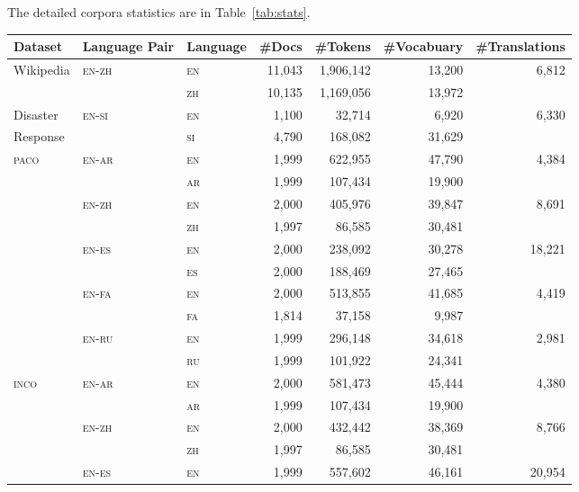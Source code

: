 \documentclass[paper=a4, fontsize=11pt]{article}
\newcommand{\paco}{\textsc{paco}\xspace}
\newcommand{\inco}{\textsc{inco}\xspace}
\newcommand{\en}{\textsc{en}\xspace}
\newcommand{\ar}{\textsc{ar}\xspace}
\newcommand{\zh}{\textsc{zh}\xspace}
\newcommand{\es}{\textsc{es}\xspace}
\newcommand{\fa}{\textsc{fa}\xspace}
\newcommand{\ru}{\textsc{ru}\xspace}
\newcommand{\si}{\textsc{si}\xspace}
\begin{document}
The detailed corpora statistics are in Table~\ref{tab:stats}.

\begin{table}[h]
  \centering
  \begin{tabular}{lllrrrr}
    Dataset & Language Pair & Language & \#Docs & \#Tokens & \#Vocabuary & \#Translations\\ \hline \hline
    \multirow{2}{*}{Wikipedia} & \multirow{2}{*}{\en-\zh} & \en & 11,043 & 1,906,142 & 13,200 & \multirow{2}{*}{6,812} \\
     & & \zh & 10,135 & 1,169,056 & 13,972 & \\ \hline
    Disaster & \multirow{2}{*}{\en-\si} & \en & 1,100 & 32,714 & 6,920 & \multirow{2}{*}{6,330} \\
    Response & & \si & 4,790 & 168,082 & 31,629 & \\ \hline
    \multirow{10}{*}{\paco} & \multirow{2}{*}{\en-\ar} & \en & 1,999 & 622,955 & 47,790 & \multirow{2}{*}{4,384} \\
     & & \ar & 1,999 & 107,434 & 19,900 & \\ \cline{2-7}
     & \multirow{2}{*}{\en-\zh} & \en & 2,000 & 405,976 & 39,847 & \multirow{2}{*}{8,691} \\
     & & \zh & 1,997 & 86,585 & 30,481 & \\ \cline{2-7}
     & \multirow{2}{*}{\en-\es} & \en & 2,000 & 238,092 & 30,278 & \multirow{2}{*}{18,221} \\
     & & \es & 2,000 & 188,469 & 27,465 & \\ \cline{2-7}
     & \multirow{2}{*}{\en-\fa} & \en & 2,000 & 513,855 & 41,685 & \multirow{2}{*}{4,419} \\
     & & \fa & 1,814 & 37,158 & 9,987 & \\ \cline{2-7}
     & \multirow{2}{*}{\en-\ru} & \en & 1,999 & 296,148 & 34,618 & \multirow{2}{*}{2,981} \\
     & & \ru & 1,999 & 101,922 & 24,341 & \\ \hline
    \multirow{10}{*}{\inco} & \multirow{2}{*}{\en-\ar} & \en & 2,000 & 581,473 & 45,444 & \multirow{2}{*}{4,380} \\
     & & \ar & 1,999 & 107,434 & 19,900 & \\ \cline{2-7}
     & \multirow{2}{*}{\en-\zh} & \en & 2,000 & 432,442 & 38,369 & \multirow{2}{*}{8,766} \\
     & & \zh & 1,997 & 86,585 & 30,481 & \\ \cline{2-7}
     & \multirow{2}{*}{\en-\es} & \en & 1,999 & 557,602 & 46,161 & \multirow{2}{*}{20,954} \\

\end{tabular}
\end{table}
\end{document}
